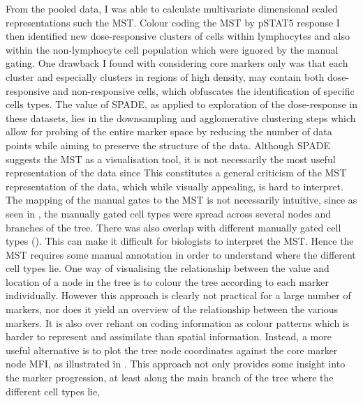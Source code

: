 From the pooled data, I was able to calculate multivariate dimensional scaled representations such the \gls{MST}.  
Colour coding the \gls{MST} by pSTAT5 response I then identified new dose-responsive clusters of cells within lymphocytes and also within the non-lymphocyte cell population which were ignored by the manual gating.
One drawback I found with considering core markers only was that each cluster and especially clusters in regions of high density, may contain both dose-responsive and non-responsive cells, which obfuscates the identification of specific cells types.
The value of \gls{SPADE}, as applied to exploration of the dose-response in these datasets, lies in the downsampling and agglomerative clustering steps which allow for probing of the entire marker space by reducing the number of data points while aiming to preserve the structure of the data.
Although \gls{SPADE} suggests the \gls{MST} as a visualisation tool, it is not necessarily the most useful representation of the data since
This constitutes a general criticism of the \gls{MST} representation of the data, which while visually appealing, is hard to interpret.
The mapping of the manual gates to the MST is not necessarily intuitive, since as seen in ,
the manually gated cell types were spread across several nodes and branches of the tree.
There was also overlap with different manually gated cell types ().
This can make it difficult for biologists to interpret the \gls{MST}.  
Hence the \gls{MST} requires some manual annotation in order to understand where the different cell types lie.
One way of visualising the relationship between the value and location of a node in the tree is to colour the tree according to each marker individually.
However this approach is clearly not practical for a large number of markers, nor does it yield an overview of the relationship between the various markers.
It is also over reliant on coding information as colour patterns which is harder to represent and assimilate than spatial information.
Instead, a more useful alternative is to plot the tree node coordinates against the core marker node MFI, as illustrated in .
This approach not only provides some insight into the marker progression, at least along the main branch of the tree where the different cell types lie,
